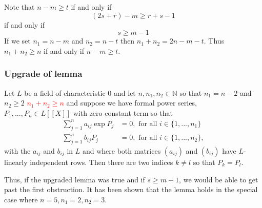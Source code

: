 \documentclass{beamer}
\newcommand{\mbb}[1]{\mathbb{#1}}
\numberwithin{equation}{section}
\begin{document}
\begin{frame}
	Note that $n - m \geq t$ if and only if
	$$(2s + r) - m \geq r + s - 1$$
	if and only if
	$$s \geq m - 1$$
	If we set $n_1 = n-m$ and $n_2 = n-t$ then $n_1 + n_2 = 2n - m - t$. Thus $n_1 + n_2 \geq n$ if and only if $n-m \geq t$.
\end{frame}

\begin{frame}
	\frametitle{Upgrade of lemma}
	Let $L$ be a field of characteristic 0 and let $n,n_1,n_2 \in \mbb N$ so that \sout{$n_1 = n - 2$ and $n_2 \geq 2$} \textcolor{red}{$n_1 + n_2 \geq n$} and suppose we have formal power series, $P_1, ..., P_n \in L[[X]]$ with zero constant term so that
	\begin{align*}
    	\sum_{j = 1}^n a_{ij} \exp P_j & = 0, \text{ for all } i \in \{1, ..., n_1\}  \\
    	\sum_{j = 1}^n b_{ij} P_j  	& = 0, \text{ for all } i \in \{1, ..., n_2\},
	\end{align*}
	with the $a_{ij}$ and $b_{ij}$ in $L$ and where both matrices $(a_{ij})$ and $(b_{ij})$ have $L$-linearly independent rows. Then there are two indices $k \neq l$ so that $P_k = P_l$.
\end{frame}

\begin{frame}
	Thus, if the upgraded lemma was true and if $s \geq m - 1$, we would be able to get past the first obstruction. It has been shown that the lemma holds in the special case where $n = 5,n_1 =2, n_2=3$.
\end{frame}


	
	
	
\end{document}
